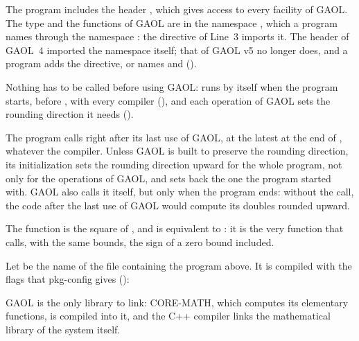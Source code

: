 \documentclass[12pt,a4paper,twoside,openright]{book}
\begin{document}
The program includes the header , which gives access to
every facility of GAOL. The type  and the functions of GAOL are
in the namespace , which a program names through the
namespace : the  directive of Line~3 imports it. The
 header of GAOL~4 imported the namespace itself; that of
GAOL v5 no longer does, and a program adds the directive, or names
 and 
().\newinvfive
{}%
%
%

Nothing has to be called before using GAOL:  runs by
itself when the program starts, before , with every compiler
(), and each operation of GAOL sets the rounding direction
it needs ().\newinvfive

\begin{Rem}\label{rem:cleanup}
The program calls  right after its last use of GAOL, at
the latest at the end of , whatever the compiler. Unless GAOL is
built to preserve the rounding direction, its initialization sets the rounding
direction upward for the whole program, not only for the operations of GAOL,
and  sets back the one the program started with. GAOL
also calls it itself, but only when the program ends: without the call, the
code after the last use of GAOL would compute its doubles rounded
upward.\newinvfive
\end{Rem}

The function  is the square of , and is equivalent
to : it is the very function that 
calls, with the same bounds, the sign of a zero bound
included.\newinvfive

\medskip
Let  be the name of the file containing the program above. It is
compiled with the flags that pkg-config gives ():
%


\noindent
GAOL is the only library to link: CORE-MATH, which computes its elementary
functions, is compiled into it, and the C++ compiler links the mathematical
library of the system itself.
\end{document}
